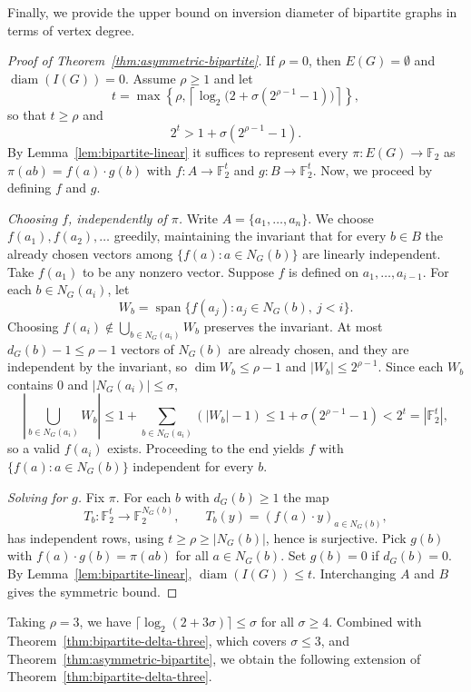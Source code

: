 \documentclass[11pt]{article}
\theoremstyle{remark}
\DeclareMathOperator{\diam}{diam}
\DeclareMathOperator{\spanop}{span}
\newcommand{\F}{\mathbb{F}}
\begin{document}
Finally, we provide the upper bound on inversion diameter of bipartite graphs in terms of vertex degree. 

\begin{proof}[Proof of Theorem~\ref{thm:asymmetric-bipartite}]
If $\rho=0$, then $E(G)=\emptyset$ and $\diam(I(G))=0$.
Assume $\rho\ge1$ and let
\[
  t=\max\left\{\rho,
  \left\lceil\log_2\bigl(2+\sigma(2^{\rho-1}-1)\bigr)\right\rceil\right\},
\]
so that $t\ge\rho$ and
\[
  2^t>1+\sigma(2^{\rho-1}-1).
\]
By Lemma~\ref{lem:bipartite-linear} it suffices to represent every $\pi:E(G)\to\F_2$ as
$\pi(ab)=f(a)\cdot g(b)$ with $f:A\to\F_2^t$ and $g:B\to\F_2^t$. Now, we proceed by defining $f$ and $g$. 

\smallskip
\noindent\emph{Choosing $f$, independently of $\pi$.}
Write $A=\{a_1,\ldots,a_n\}$.
We choose $f(a_1),f(a_2),\ldots$ greedily, maintaining the invariant that for every $b\in B$ the already chosen vectors among $\{f(a):a\in N_G(b)\}$ are linearly independent.
Take $f(a_1)$ to be any nonzero vector.
Suppose $f$ is defined on $a_1,\ldots,a_{i-1}$.
For each $b\in N_G(a_i)$, let
\[
  W_b=\spanop\{f(a_j):a_j\in N_G(b),\ j<i\}.
\]
Choosing $f(a_i)\notin\bigcup_{b\in N_G(a_i)} W_b$ preserves the invariant.
At most $d_G(b)-1\le\rho-1$ vectors of $N_G(b)$ are already chosen, and they are independent by the invariant, so
$\dim W_b\le\rho-1$ and $|W_b|\le2^{\rho-1}$.
Since each $W_b$ contains $0$ and $|N_G(a_i)|\le\sigma$,
\[
  \left|\bigcup_{b\in N_G(a_i)} W_b\right|
  \le 1+\sum_{b\in N_G(a_i)}(|W_b|-1)
  \le1+\sigma(2^{\rho-1}-1)<2^t=|\F_2^t|,
\]
so a valid $f(a_i)$ exists.
Proceeding to the end yields $f$ with $\{f(a):a\in N_G(b)\}$ independent for every $b$.

\smallskip
\noindent\emph{Solving for $g$.}
Fix $\pi$.
For each $b$ with $d_G(b)\ge1$ the map
\[
  T_b:\F_2^t\to\F_2^{N_G(b)},\qquad
  T_b(y)=(f(a)\cdot y)_{a\in N_G(b)},
\]
has independent rows, using $t\ge\rho\ge|N_G(b)|$, hence is surjective.
Pick $g(b)$ with $f(a)\cdot g(b)=\pi(ab)$ for all $a\in N_G(b)$.
Set $g(b)=0$ if $d_G(b)=0$.
By Lemma~\ref{lem:bipartite-linear}, $\diam(I(G))\le t$.
Interchanging $A$ and $B$ gives the symmetric bound.
\end{proof}

Taking $\rho=3$, we have 
$\lceil\log_2(2+3\sigma)\rceil\le\sigma$ for all $\sigma\ge4$. Combined with Theorem~\ref{thm:bipartite-delta-three}, which covers $\sigma\le3$, and Theorem~\ref{thm:asymmetric-bipartite}, we obtain the following extension of Theorem~\ref{thm:bipartite-delta-three}.
\end{document}
